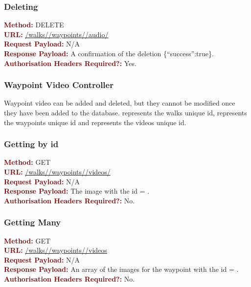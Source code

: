 \documentclass[11pt,a4paper]{report}
\begin{document}
\subsubsection{Deleting}
\textbf{\textcolor{Maroon}{Method:}} DELETE\\
\textbf{\textcolor{Maroon}{URL:}} \url{/walks/}\url{/waypoints/}\url{/audio/}\\
\textbf{\textcolor{Maroon}{Request Payload:}} N/A\\
\textbf{\textcolor{Maroon}{Response Payload:}} A confirmation of the deletion \{``success'':true\}.\\
\textbf{\textcolor{Maroon}{Authorisation Headers Required?:}} Yes.

\subsubsection{Waypoint Video Controller}
Waypoint video can be added and deleted, but they cannot be modified once they have been added to the database.  represents the walks unique id,  represents the waypoints unique id and  represents the videos unique id. 
 
\subsubsection{Getting by id}
\textbf{\textcolor{Maroon}{Method:}} GET\\
\textbf{\textcolor{Maroon}{URL:}} \url{/walks/}\url{/waypoints/}\url{/videos/}\\
\textbf{\textcolor{Maroon}{Request Payload:}} N/A\\
\textbf{\textcolor{Maroon}{Response Payload:}} The image with the id = .\\
\textbf{\textcolor{Maroon}{Authorisation Headers Required?:}} No.

\subsubsection{Getting Many}
\textbf{\textcolor{Maroon}{Method:}} GET\\
\textbf{\textcolor{Maroon}{URL:}} \url{/walks/}\url{/waypoints/}\url{/videos}\\
\textbf{\textcolor{Maroon}{Request Payload:}} N/A\\
\textbf{\textcolor{Maroon}{Response Payload:}} An array of the images for the waypoint with the id = .\\
\textbf{\textcolor{Maroon}{Authorisation Headers Required?:}} No.
\end{document}
